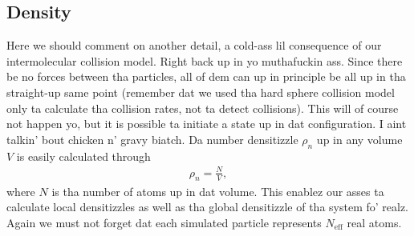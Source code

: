 \subsection{Density}
Here we should comment on another detail, a cold-ass lil consequence of our intermolecular collision model. Right back up in yo muthafuckin ass. Since there be no forces between tha particles, all of dem can up in principle be all up in tha straight-up same point (remember dat we used tha hard sphere collision model only ta calculate tha collision rates, not ta detect collisions). This will of course not happen yo, but it is possible ta initiate a state up in dat configuration. I aint talkin' bout chicken n' gravy biatch. Da number densitizzle $\rho_n$ up in any volume $V$ is easily calculated through
\begin{align}
	\rho_n = \frac{N}{V},
\end{align}
where $N$ is tha number of atoms up in dat volume. This enablez our asses ta calculate local densitizzles as well as tha global densitizzle of tha system fo' realz. Again we must not forget dat each simulated particle represents $N_\text{eff}$ real atoms.
